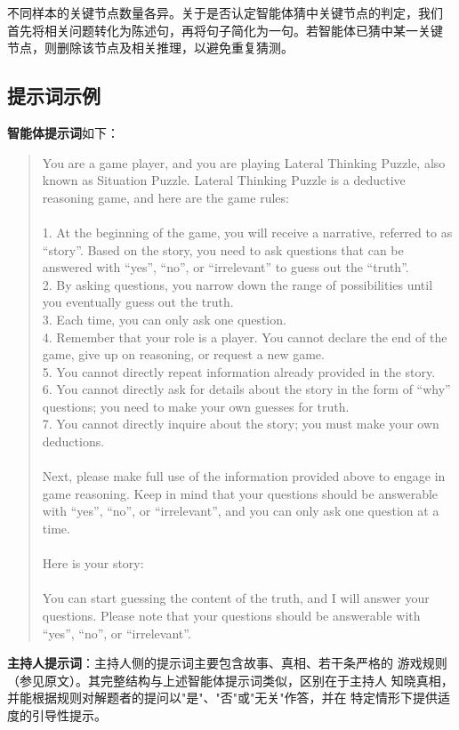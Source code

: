 不同样本的关键节点数量各异。关于是否认定智能体猜中关键节点的判定，我们
首先将相关问题转化为陈述句，再将句子简化为一句。若智能体已猜中某一关键
节点，则删除该节点及相关推理，以避免重复猜测。

\subsection{提示词示例}

\textbf{智能体提示词}如下：
\begin{quote}\small\ttfamily
You are a game player, and you are playing Lateral Thinking Puzzle, also
known as Situation Puzzle. Lateral Thinking Puzzle is a deductive reasoning
game, and here are the game rules:\\
\\
1. At the beginning of the game, you will receive a narrative, referred
to as ``story''. Based on the story, you need to ask questions that can
be answered with ``yes'', ``no'', or ``irrelevant'' to guess out the
``truth''.\\
2. By asking questions, you narrow down the range of possibilities until
you eventually guess out the truth.\\
3. Each time, you can only ask one question.\\
4. Remember that your role is a player. You cannot declare the end of the
game, give up on reasoning, or request a new game.\\
5. You cannot directly repeat information already provided in the story.\\
6. You cannot directly ask for details about the story in the form of
``why'' questions; you need to make your own guesses for truth.\\
7. You cannot directly inquire about the story; you must make your own
deductions.\\
\\
Next, please make full use of the information provided above to engage in
game reasoning. Keep in mind that your questions should be answerable
with ``yes'', ``no'', or ``irrelevant'', and you can only ask one
question at a time.\\
\\
Here is your story: \\
\\
You can start guessing the content of the truth, and I will answer your
questions. Please note that your questions should be answerable with
``yes'', ``no'', or ``irrelevant''.
\end{quote}

\textbf{主持人提示词}：主持人侧的提示词主要包含故事、真相、若干条严格的
游戏规则（参见原文）。其完整结构与上述智能体提示词类似，区别在于主持人
知晓真相，并能根据规则对解题者的提问以"是"、"否"或"无关"作答，并在
特定情形下提供适度的引导性提示。
